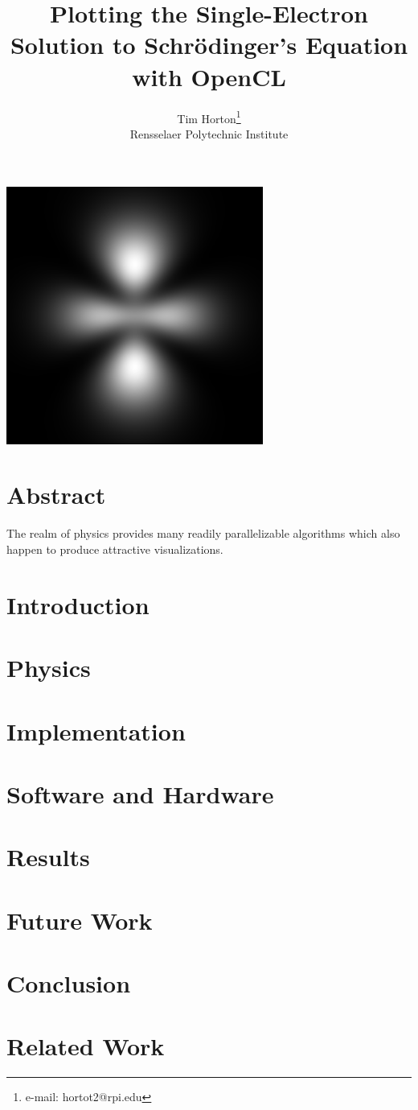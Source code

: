 \documentclass{acmsiggraph}
\title{Plotting the Single-Electron Solution to Schr\"{o}dinger's Equation with OpenCL}
\author{Tim Horton\thanks{e-mail: hortot2@rpi.edu}\\Rensselaer Polytechnic Institute}
\begin{document}
\maketitle

\includegraphics[width=84.5mm]{320.png}

\section{Abstract}

The realm of physics provides many readily parallelizable algorithms which also happen to produce attractive visualizations.

\section{Introduction}

\section{Physics}

\section{Implementation}

\section{Software and Hardware}

\section{Results}

\section{Future Work}

\section{Conclusion}

\section{Related Work}


\nocite{*}

\end{document}
